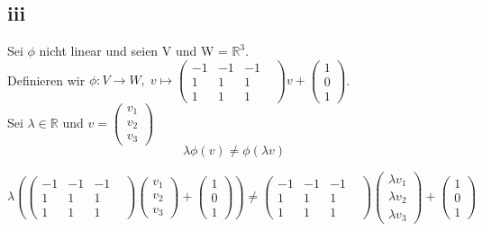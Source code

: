 \documentclass[10pt,a4paper]{article}
\begin{document}
\subsection{iii}
Sei $\phi$ nicht linear und seien V und W = $\mathbb{R}^3$.\\
Definieren wir $\phi: V \rightarrow W,\; v \mapsto 
\begin{pmatrix}
-1&-1&-1&\\1&1&1&\\1&1&1&
\end{pmatrix} v +\begin{pmatrix}
1\\0\\1\end{pmatrix}$.\\
Sei $\lambda \in \mathbb{R}$ und $v = \begin{pmatrix}v_1\\v_2\\v_3\end{pmatrix}$\\
$$\lambda \phi(v) \neq \phi(\lambda v) $$

$$
\lambda \left(\begin{pmatrix}
-1&-1&-1&\\1&1&1&\\1&1&1&
\end{pmatrix} 
\begin{pmatrix}v_1\\v_2\\v_3\end{pmatrix}
 +\begin{pmatrix}
1\\0\\1\end{pmatrix}\right)
\neq 
\begin{pmatrix}
-1&-1&-1&\\1&1&1&\\1&1&1&
\end{pmatrix} 
\begin{pmatrix}\lambda v_1\\\lambda v_2\\\lambda v_3\end{pmatrix}
 +\begin{pmatrix}
1\\0\\1\end{pmatrix}
$$
\end{document}
